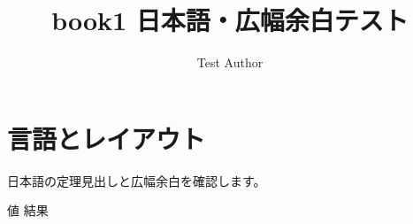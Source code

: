 \documentclass[11pt,a4paper,openright]{ltjsbook}
\title{book1 日本語・広幅余白テスト}
\author{Test Author}
\begin{document}
\maketitle
\chapter{言語とレイアウト}

\begin{theorem}[見出し]
日本語の定理見出しと広幅余白を確認します。
\end{theorem}

\begin{algorithm}
  \caption{入出力見出しの確認}
  \begin{algorithmic}
    \AlgInput 値
    \AlgOutput 結果
  \end{algorithmic}
\end{algorithm}
\end{document}
